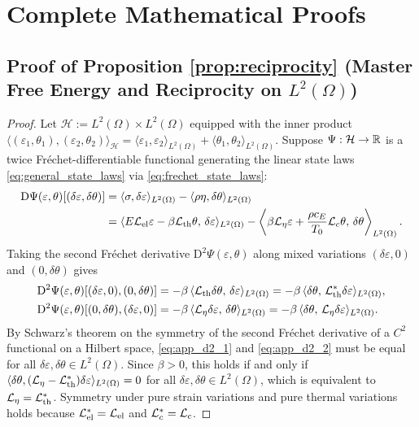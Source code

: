 \section{Complete Mathematical Proofs}\label{app:proofs}

\subsection{Proof of Proposition \ref{prop:reciprocity} (Master Free Energy and Reciprocity on $L^2(\Omega)$)}\label{app:proof_prop1}

\begin{proof}
Let $\mathcal{H} := L^2(\Omega) \times L^2(\Omega)$ equipped with the inner product $\langle(\varepsilon_1,\theta_1),(\varepsilon_2,\theta_2)\rangle_{\mathcal{H}} = \langle\varepsilon_1,\varepsilon_2\rangle_{L^2(\Omega)} + \langle\theta_1,\theta_2\rangle_{L^2(\Omega)}$. Suppose $\Psi : \mathcal{H} \to \mathbb{R}$ is a twice Fr{\'e}chet-differentiable functional generating the linear state laws \eqref{eq:general_state_laws} via \eqref{eq:frechet_state_laws}:
\begin{align}\label{eq:app_first_variation}
  \mathrm{D}\Psi(\varepsilon,\theta)[(\delta\varepsilon,\delta\theta)]
  &= \langle\sigma,\delta\varepsilon\rangle_{L^2(\Omega)} - \langle\rho\eta,\delta\theta\rangle_{L^2(\Omega)} \nonumber\\
  &= \langle E\mathcal{L}_{\mathrm{el}}\varepsilon - \beta\mathcal{L}_{\mathrm{th}}\theta,\,\delta\varepsilon\rangle_{L^2(\Omega)} - \left\langle\beta\mathcal{L}_\eta\varepsilon + \frac{\rho c_E}{T_0}\mathcal{L}_c\theta,\,\delta\theta\right\rangle_{L^2(\Omega)}.
\end{align}
Taking the second Fr{\'e}chet derivative $\mathrm{D}^2\Psi(\varepsilon,\theta)$ along mixed variations $(\delta\varepsilon,0)$ and $(0,\delta\theta)$ gives
\begin{align}
  \mathrm{D}^2\Psi(\varepsilon,\theta)[(\delta\varepsilon,0),(0,\delta\theta)] &= -\beta\,\langle\mathcal{L}_{\mathrm{th}}\delta\theta,\,\delta\varepsilon\rangle_{L^2(\Omega)} = -\beta\,\langle\delta\theta,\,\mathcal{L}_{\mathrm{th}}^*\delta\varepsilon\rangle_{L^2(\Omega)}, \label{eq:app_d2_1}\\
  \mathrm{D}^2\Psi(\varepsilon,\theta)[(0,\delta\theta),(\delta\varepsilon,0)] &= -\beta\,\langle\mathcal{L}_\eta\delta\varepsilon,\,\delta\theta\rangle_{L^2(\Omega)} = -\beta\,\langle\delta\theta,\,\mathcal{L}_\eta\delta\varepsilon\rangle_{L^2(\Omega)}. \label{eq:app_d2_2}
\end{align}
By Schwarz's theorem on the symmetry of the second Fr{\'e}chet derivative of a $C^2$ functional on a Hilbert space, \eqref{eq:app_d2_1} and \eqref{eq:app_d2_2} must be equal for all $\delta\varepsilon,\delta\theta \in L^2(\Omega)$. Since $\beta > 0$, this holds if and only if $\langle\delta\theta, (\mathcal{L}_\eta - \mathcal{L}_{\mathrm{th}}^*)\delta\varepsilon\rangle_{L^2(\Omega)} = 0$ for all $\delta\varepsilon,\delta\theta \in L^2(\Omega)$, which is equivalent to $\mathcal{L}_\eta = \mathcal{L}_{\mathrm{th}}^*$. Symmetry under pure strain variations and pure thermal variations holds because $\mathcal{L}_{\mathrm{el}}^* = \mathcal{L}_{\mathrm{el}}$ and $\mathcal{L}_c^* = \mathcal{L}_c$.


\end{proof}
